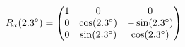 \documentclass[preview]{standalone}
\begin{document}
\begin{align*}
\special{dvisvgm:raw <g id='unique000'>}R_x(2.3^\circ) = \begin{pmatrix} 1 & 0 & 0 \\ 0 & \cos(2.3^\circ) & -\sin(2.3^\circ) \\ 0 & \sin(2.3^\circ) & \cos(2.3^\circ) \end{pmatrix}\special{dvisvgm:raw </g>}
\end{align*}
\end{document}

